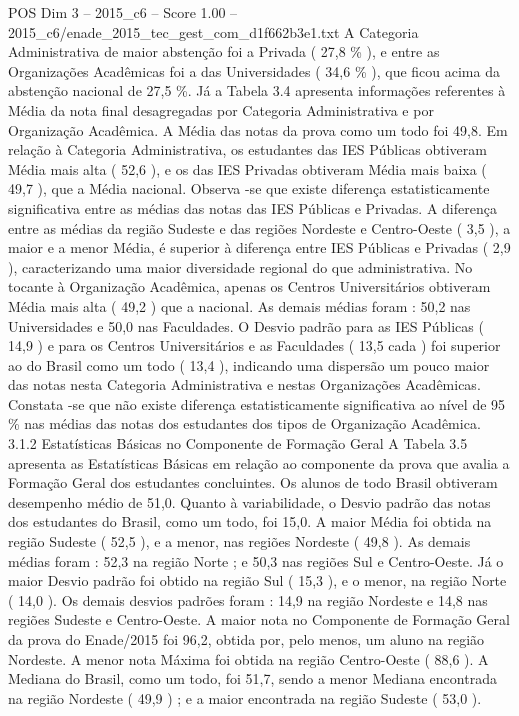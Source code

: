 \begin{textsample}{POS Dim 3 – 2015\_c6 – Score 1.00 – 2015\_c6/enade\_2015\_tec\_gest\_com\_d1f662b3e1.txt}
A Categoria Administrativa de maior abstenção foi a Privada ( 27,8 \% ), e entre as Organizações Acadêmicas foi a das Universidades ( 34,6 \% ), que ficou acima da abstenção nacional de 27,5 \%.
Já a Tabela 3.4 apresenta informações referentes à Média da nota final desagregadas por Categoria Administrativa e por Organização Acadêmica.
A Média das notas da prova como um todo foi 49,8.
Em relação à Categoria Administrativa, os estudantes das IES Públicas obtiveram Média mais alta ( 52,6 ), e os das IES Privadas obtiveram Média mais baixa ( 49,7 ), que a Média nacional.
Observa -se que existe diferença estatisticamente significativa entre as médias das notas das IES Públicas e Privadas.
A diferença entre as médias da região Sudeste e das regiões Nordeste e Centro-Oeste ( 3,5 ), a maior e a menor Média, é superior à diferença entre IES Públicas e Privadas ( 2,9 ), caracterizando uma maior diversidade regional do que administrativa.
No tocante à Organização Acadêmica, apenas os Centros Universitários obtiveram Média mais alta ( 49,2 ) que a nacional.
As demais médias foram : 50,2 nas Universidades e 50,0 nas Faculdades.
O Desvio padrão para as IES Públicas ( 14,9 ) e para os Centros Universitários e as Faculdades ( 13,5 cada ) foi superior ao do Brasil como um todo ( 13,4 ), indicando uma dispersão um pouco maior das notas nesta Categoria Administrativa e nestas Organizações Acadêmicas.
Constata -se que não existe diferença estatisticamente significativa ao nível de 95 \% nas médias das notas dos estudantes dos tipos de Organização Acadêmica. 3.1.2 Estatísticas Básicas no Componente de Formação Geral A Tabela 3.5 apresenta as Estatísticas Básicas em relação ao componente da prova que avalia a Formação Geral dos estudantes concluintes.
Os alunos de todo Brasil obtiveram desempenho médio de 51,0.
Quanto à variabilidade, o Desvio padrão das notas dos estudantes do Brasil, como um todo, foi 15,0.
A maior Média foi obtida na região Sudeste ( 52,5 ), e a menor, nas regiões Nordeste ( 49,8 ).
As demais médias foram : 52,3 na região Norte ; e 50,3 nas regiões Sul e Centro-Oeste.
Já o maior Desvio padrão foi obtido na região Sul ( 15,3 ), e o menor, na região Norte ( 14,0 ).
Os demais desvios padrões foram : 14,9 na região Nordeste e 14,8 nas regiões Sudeste e Centro-Oeste.
A maior nota no Componente de Formação Geral da prova do Enade/2015 foi 96,2, obtida por, pelo menos, um aluno na região Nordeste.
A menor nota Máxima foi obtida na região Centro-Oeste ( 88,6 ).
A Mediana do Brasil, como um todo, foi 51,7, sendo a menor Mediana encontrada na região Nordeste ( 49,9 ) ; e a maior encontrada na região Sudeste ( 53,0 ).

\end{textsample}
